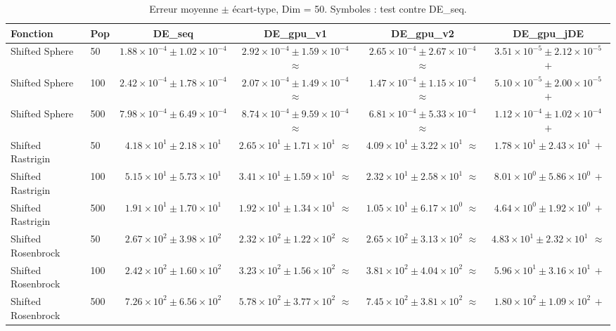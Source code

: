 \begin{table}[t]
\centering
\caption{Erreur moyenne $\pm$ écart-type, Dim = 50. Symboles : test contre DE\_seq.}
\label{tab:quality_d50}
\scriptsize
\begin{tabular}{llcccc}
\toprule
Fonction & Pop & DE\_seq & DE\_gpu\_v1 & DE\_gpu\_v2 & DE\_gpu\_jDE \\
\midrule
Shifted Sphere & 50 & $1.88\times10^{-4}\pm1.02\times10^{-4}$ & $2.92\times10^{-4}\pm1.59\times10^{-4}$ $\approx$ & $2.65\times10^{-4}\pm2.67\times10^{-4}$ $\approx$ & \textbf{$3.51\times10^{-5}\pm2.12\times10^{-5}$ $+$} \\
Shifted Sphere & 100 & $2.42\times10^{-4}\pm1.78\times10^{-4}$ & $2.07\times10^{-4}\pm1.49\times10^{-4}$ $\approx$ & $1.47\times10^{-4}\pm1.15\times10^{-4}$ $\approx$ & \textbf{$5.10\times10^{-5}\pm2.00\times10^{-5}$ $+$} \\
Shifted Sphere & 500 & $7.98\times10^{-4}\pm6.49\times10^{-4}$ & $8.74\times10^{-4}\pm9.59\times10^{-4}$ $\approx$ & $6.81\times10^{-4}\pm5.33\times10^{-4}$ $\approx$ & \textbf{$1.12\times10^{-4}\pm1.02\times10^{-4}$ $+$} \\
Shifted Rastrigin & 50 & $4.18\times10^{1}\pm2.18\times10^{1}$ & $2.65\times10^{1}\pm1.71\times10^{1}$ $\approx$ & $4.09\times10^{1}\pm3.22\times10^{1}$ $\approx$ & \textbf{$1.78\times10^{1}\pm2.43\times10^{1}$ $+$} \\
Shifted Rastrigin & 100 & $5.15\times10^{1}\pm5.73\times10^{1}$ & $3.41\times10^{1}\pm1.59\times10^{1}$ $\approx$ & $2.32\times10^{1}\pm2.58\times10^{1}$ $\approx$ & \textbf{$8.01\times10^{0}\pm5.86\times10^{0}$ $+$} \\
Shifted Rastrigin & 500 & $1.91\times10^{1}\pm1.70\times10^{1}$ & $1.92\times10^{1}\pm1.34\times10^{1}$ $\approx$ & $1.05\times10^{1}\pm6.17\times10^{0}$ $\approx$ & \textbf{$4.64\times10^{0}\pm1.92\times10^{0}$ $+$} \\
Shifted Rosenbrock & 50 & $2.67\times10^{2}\pm3.98\times10^{2}$ & $2.32\times10^{2}\pm1.22\times10^{2}$ $\approx$ & $2.65\times10^{2}\pm3.13\times10^{2}$ $\approx$ & \textbf{$4.83\times10^{1}\pm2.32\times10^{1}$ $\approx$} \\
Shifted Rosenbrock & 100 & $2.42\times10^{2}\pm1.60\times10^{2}$ & $3.23\times10^{2}\pm1.56\times10^{2}$ $\approx$ & $3.81\times10^{2}\pm4.04\times10^{2}$ $\approx$ & \textbf{$5.96\times10^{1}\pm3.16\times10^{1}$ $+$} \\
Shifted Rosenbrock & 500 & $7.26\times10^{2}\pm6.56\times10^{2}$ & $5.78\times10^{2}\pm3.77\times10^{2}$ $\approx$ & $7.45\times10^{2}\pm3.81\times10^{2}$ $\approx$ & \textbf{$1.80\times10^{2}\pm1.09\times10^{2}$ $+$} \\

\end{tabular}
\end{table}
